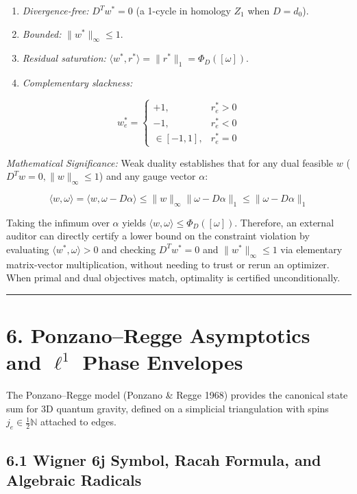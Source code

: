 \documentclass[11pt]{article}
\begin{document}
\begin{enumerate}[leftmargin=1.4em,itemsep=0.2em]
\item \emph{Divergence-free:} $D^T w^* = 0$ (a 1-cycle in homology $Z_1$ when $D = d_0$).
\item \emph{Bounded:} $\|w^*\|_\infty \le 1$.
\item \emph{Residual saturation:} $\langle w^*, r^* \rangle = \|r^*\|_1 = \Phi_D([\omega])$.
\item \emph{Complementary slackness:}
\end{enumerate}
\begin{equation*}
   w_e^* = \begin{cases}
   +1, & r_e^* > 0 \\
   -1, & r_e^* < 0 \\
   \in [-1, 1], & r_e^* = 0
   \end{cases}
\end{equation*}

\emph{Mathematical Significance:} Weak duality establishes that for any dual feasible $w$ ($D^T w = 0, \|w\|_\infty \le 1$) and any gauge vector $\alpha$:

\begin{equation*}
\langle w, \omega \rangle = \langle w, \omega - D\alpha \rangle \le \|w\|_\infty \|\omega - D\alpha\|_1 \le \|\omega - D\alpha\|_1
\end{equation*}

Taking the infimum over $\alpha$ yields $\langle w, \omega \rangle \le \Phi_D([\omega])$. Therefore, an external auditor can directly certify a lower bound on the constraint violation by evaluating $\langle w^*, \omega \rangle > 0$ and checking $D^T w^* = 0$ and $\|w^*\|_\infty \le 1$ via elementary matrix-vector multiplication, without needing to trust or rerun an optimizer. When primal and dual objectives match, optimality is certified unconditionally.

\medskip\hrule\medskip
\section{\texorpdfstring{6. Ponzano--Regge Asymptotics and $\ell^1$ Phase Envelopes}{6. Ponzano--Regge Asymptotics and ℓ¹ Phase Envelopes}}

The Ponzano--Regge model (Ponzano \& Regge 1968) provides the canonical state sum for 3D quantum gravity, defined on a simplicial triangulation with spins $j_e \in \frac{1}{2}\mathbb{N}$ attached to edges.

\subsection{\texorpdfstring{6.1 Wigner 6j Symbol, Racah Formula, and Algebraic Radicals}{6.1 Wigner 6j Symbol, Racah Formula, and Algebraic Radicals}}
\end{document}
